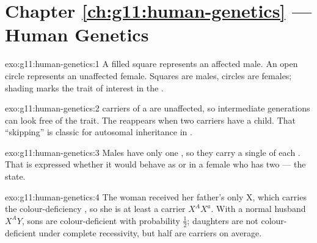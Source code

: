 \section*{Chapter \ref{ch:g11:human-genetics} --- Human Genetics}

\begin{solution}{exo:g11:human-genetics:1}
A filled square represents an affected male. An open circle represents an
unaffected female. Squares are males, circles are females; shading marks the
trait of interest in the .
\end{solution}

\begin{solution}{exo:g11:human-genetics:2}
 carriers of a  are unaffected, so intermediate
generations can look free of the trait. The  reappears when two
carriers have a   child. That ``skipping'' is classic for
autosomal  inheritance in .
\end{solution}

\begin{solution}{exo:g11:human-genetics:3}
Males have only one , so they carry a single  of each
 . That  is expressed whether it would behave as 
or  in a female who has two  --- the  state.
\end{solution}

\begin{solution}{exo:g11:human-genetics:4}
The woman received her father's only X, which carries the colour-deficiency
, so she is at least a carrier $X^{A}X^{a}$. With a normal husband
$X^{A}Y$, sons are colour-deficient with probability $\tfrac12$; daughters are
not colour-deficient under complete recessivity, but half are carriers on
average.
\end{solution}

